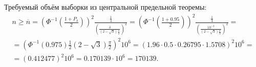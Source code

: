 \documentclass[a4paper,12pt]{article}
\begin{document}
Требуемый объём выборки из центральной предельной теоремы:
\begin{multline*}
    n
    \ge \overline{n}
    = \left( \Phi^{-1} \left( \frac{1 + P_\delta}{2} \right) \right)^2 \frac{\frac{1}{4}}{\left( \frac{\delta}{\left( 2 - \sqrt{3} \right) \frac{\pi}{2}} \right)^2}
    = \left( \Phi^{-1} \left( \frac{1 + 0.95}{2} \right) \right)^2 \frac{\frac{1}{4}}{\left( \frac{10^{-3}}{\left( 2 - \sqrt{3} \right) \frac{\pi}{2}} \right)^2} = \\
    = \left( \Phi^{-1} ( 0.975 ) \frac{1}{2} \left( 2 - \sqrt{3} \right) \frac{\pi}{2} \right)^2 10^6
    = \left( 1.96 \cdot 0.5 \cdot 0.26795 \cdot 1.5708 \right)^2 10^6 = \\
    = \left( 0.412477 \right)^2 10^6
    = 0.170139 \cdot 10^6
    = 170 139 .
\end{multline*}
\end{document}
